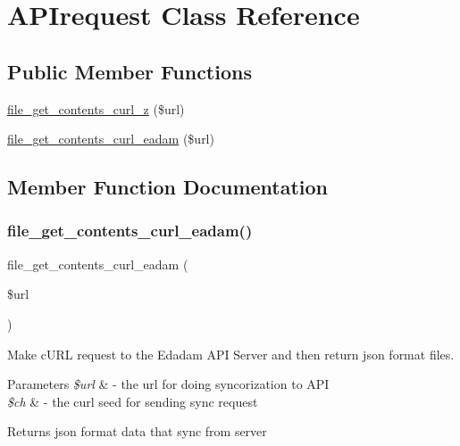 \hypertarget{class_a_p_irequest}{}\section{A\+P\+Irequest Class Reference}
\label{class_a_p_irequest}
\subsection*{Public Member Functions}
\begin{DoxyCompactItemize}
\item 
\mbox{\hyperlink{class_a_p_irequest_a65f97cf2471736a6999cefebea218a03}{file\+\_\+get\+\_\+contents\+\_\+curl\+\_\+z}} (\$url)
\item 
\mbox{\hyperlink{class_a_p_irequest_aa3376c3f771a5cb3ad5356d22674a5ad}{file\+\_\+get\+\_\+contents\+\_\+curl\+\_\+eadam}} (\$url)
\end{DoxyCompactItemize}


\subsection{Member Function Documentation}
\mbox{\label{class_a_p_irequest_aa3376c3f771a5cb3ad5356d22674a5ad}} 
\subsubsection{\texorpdfstring{file\+\_\+get\+\_\+contents\+\_\+curl\+\_\+eadam()}{file\_get\_contents\_curl\_eadam()}}
{\footnotesize\ttfamily file\+\_\+get\+\_\+contents\+\_\+curl\+\_\+eadam (\begin{DoxyParamCaption}\item[{}]{\$url }\end{DoxyParamCaption})}

Make c\+U\+RL request to the Edadam A\+PI Server and then return json format files.


\begin{DoxyParams}{Parameters}
{\em \$url} & -\/ the url for doing syncorization to A\+PI \\
\hline
{\em \$ch} & -\/ the curl seed for sending sync request \\
\hline
\end{DoxyParams}
\begin{DoxyReturn}{Returns}
json format data that sync from server
\end{DoxyReturn}
\mbox{\label{class_a_p_irequest_a65f97cf2471736a6999cefebea218a03}} 
